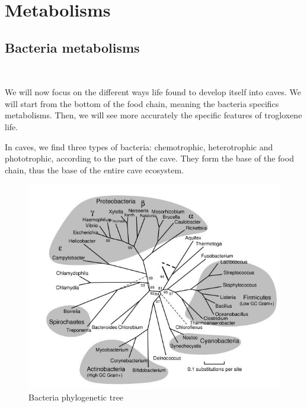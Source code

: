 \documentclass[draft, final]{report}
\begin{document}
\clearpage

\chapter{Metabolisms}

\section{Bacteria metabolisms}
~\par
We will now focus on the different ways life found to develop itself into caves. We will start from the bottom of the food chain, meaning the bacteria specifics metabolisms. Then, we will see more accurately the specific features of trogloxene life. \\
\par
In caves, we find three types of bacteria: chemotrophic, heterotrophic and phototrophic, according to the part of the cave. They form the base of the food chain, thus the base of the entire cave ecosystem.\\
\par

\begin{figure}[!ht]
  \centering
  \includegraphics[scale=0.79]{LateX/Images/PhylogeneticTree.png}
  \caption{Bacteria phylogenetic tree\cite{phylobacteria}}
\end{figure}
\end{document}
